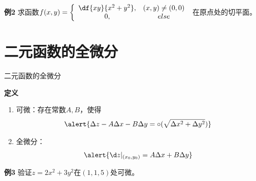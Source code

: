 \begin{frame}
	\linespread{1.2}
	\begin{exampleblock}{{\bf 例2}\hfill}
		求函数$f(x,y)=\left\{\begin{array}{cc}
			\df{xy}{x^2+y^2},& (x,y)\ne (0,0)\\
			0, & else
		\end{array}\right.$
		在原点处的切平面。
	\end{exampleblock}\pause 
	\begin{center}
	\end{center}
\end{frame}

\section{二元函数的全微分}

\begin{frame}{二元函数的全微分}
	\linespread{1.2}\pause 
	\begin{block}{{\bf 定义}\hfill}
		\begin{enumerate}
		  \item {\bb 可微：}存在常数$A,B$，使得
		  $$\alert{\Delta z-A\Delta x-B\Delta y=\circ(\sqrt{\Delta x^2+\Delta y^2})}$$
		  \pause \vspace{-2em}
		  \item {\bb 全微分：}
		  $$\alert{\d z|_{(x_0,y_0)}=A\Delta x+B\Delta y}$$
		\end{enumerate}
	\end{block}\pause 
	\begin{exampleblock}{{\bf 例3}\hfill}
		验证$z=2x^2+3y^2$在$(1,1,5)$处可微。
	\end{exampleblock}
\end{frame}


